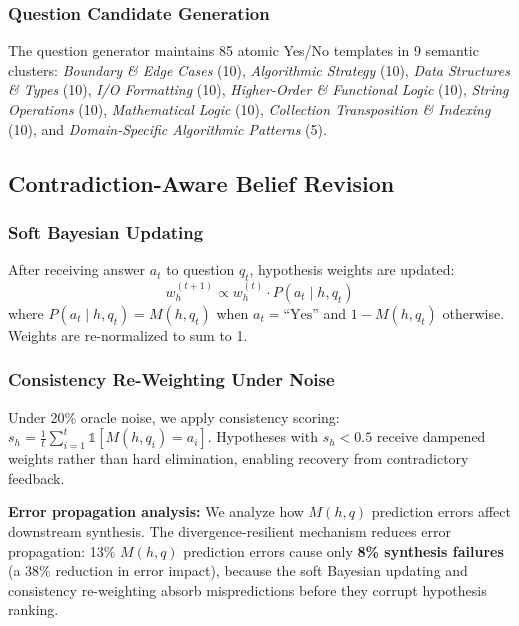\documentclass[10pt,conference]{IEEEtran}
\begin{document}
\subsubsection{Question Candidate Generation}
The question generator maintains 85 atomic Yes/No templates in 9 semantic clusters: \textit{Boundary \& Edge Cases} (10), \textit{Algorithmic Strategy} (10), \textit{Data Structures \& Types} (10), \textit{I/O Formatting} (10), \textit{Higher-Order \& Functional Logic} (10), \textit{String Operations} (10), \textit{Mathematical Logic} (10), \textit{Collection Transposition \& Indexing} (10), and \textit{Domain-Specific Algorithmic Patterns} (5).

\subsection{Contradiction-Aware Belief Revision}\label{sec:method:belief}

\subsubsection{Soft Bayesian Updating}
After receiving answer $a_t$ to question $q_t$, hypothesis weights are updated:
\begin{equation}\label{eq:bayes}
w_h^{(t+1)} \propto w_h^{(t)} \cdot P(a_t \mid h, q_t)
\end{equation}
where $P(a_t \mid h, q_t) = M(h, q_t)$ when $a_t = \text{``Yes''}$ and $1 - M(h, q_t)$ otherwise. Weights are re-normalized to sum to 1.

\subsubsection{Consistency Re-Weighting Under Noise}
Under 20\% oracle noise, we apply consistency scoring: $s_h = \frac{1}{t} \sum_{i=1}^{t} \mathbb{1}[M(h, q_i) = a_i]$. Hypotheses with $s_h < 0.5$ receive dampened weights rather than hard elimination, enabling recovery from contradictory feedback.

\textbf{Error propagation analysis:} We analyze how $M(h,q)$ prediction errors affect downstream synthesis. The divergence-resilient mechanism reduces error propagation: 13\% $M(h,q)$ prediction errors cause only \textbf{8\% synthesis failures} (a 38\% reduction in error impact), because the soft Bayesian updating and consistency re-weighting absorb mispredictions before they corrupt hypothesis ranking.
\end{document}
